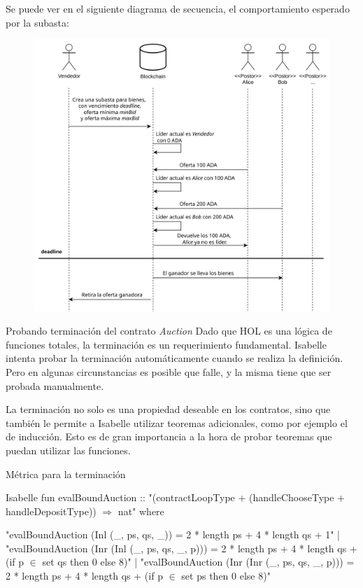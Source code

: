 \documentclass{beamer}
\begin{document}
\begin{frame}

Se puede ver en el siguiente diagrama de secuencia, el comportamiento esperado por la subasta:

\begin{figure}[H]
    \centering
    \includegraphics[height=0.8\textheight]{Auction.png}
\end{figure}

\end{frame}

\begin{frame}{Probando terminación del contrato \textit{Auction}}
Dado que HOL es una lógica de funciones totales, la terminación es un requerimiento fundamental. Isabelle intenta probar la terminación automáticamente cuando se realiza la definición. Pero en algunas circunstancias es posible que falle, y la misma tiene que ser probada manualmente.

\bigskip
\pause

La terminación no solo es una propiedad deseable en los contratos, sino que también le permite a Isabelle utilizar teoremas adicionales, como por ejemplo el de inducción. Esto es de gran importancia a la hora de probar teoremas que puedan utilizar las funciones.

\end{frame}

\begin{frame}[fragile]{Métrica para la terminación}
\begin{code}{Isabelle}
fun evalBoundAuction :: "(contractLoopType + (handleChooseType + handleDepositType)) $\Rightarrow$ nat" where

"evalBoundAuction (Inl (_, ps, qs, _)) =
        2 * length ps + 4 * length qs + 1" |
"evalBoundAuction (Inr (Inl (_, ps, qs, _, p))) =
        2 * length ps + 4 * length qs + (if p $\in$ set qs then 0 else 8)" |
"evalBoundAuction (Inr (Inr (_, ps, qs, _, p))) =
        2 * length ps + 4 * length qs + (if p $\in$ set ps then 0 else 8)"
\end{code}

\end{frame}
\end{document}
